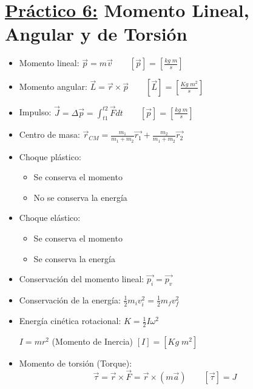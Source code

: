 \documentclass[12pt,a4paper]{article}
\newcommand{\PN}{\par\noindent}
\begin{document}
	\section*{\underline{Práctico 6:} Momento Lineal, Angular y de Torsión}
		\begin{multicols}{2}
			\begin{itemize}
				\item Momento lineal: $\vec{p} = m \vec{v} \qquad [\vec{p}] = [\frac{kg \; m}{s}]$
				\item Momento angular: $\vec{L} = \vec{r} \times \vec{p} \qquad [\vec{L}] = [\frac{Kg \; m^{2}}{s}]$
				\item Impulso: $\vec{J} = \Delta \vec{p} = \int_{t1}^{t2} \vec{F} dt \qquad [\vec{p}] = [\frac{kg \; m}{s}]$
				\item Centro de masa: $\vec{r}_{CM} = \frac{m_{1}}{m_{1} + m_{2}} \vec{r_{1}} + \frac{m_{2}}{m_{1} + m_{2}}
					\vec{r_{2}}$
				\item Choque plástico:
					\begin{itemize}
						\item Se conserva el momento
						\item No se conserva la energía
					\end{itemize}
				\item Choque elástico:
					\begin{itemize}
						\item Se conserva el momento
						\item Se conserva la energía
					\end{itemize}
				\item Conservación del momento lineal: $\vec{p_{i}} = \vec{p_{v}}$
				\item Conservación de la energía: $\frac{1}{2} m_{i} v_{i}^{2} = \frac{1}{2} m_{f} v_{f}^{2}$
				\item Energía cinética rotacional: $K = \frac{1}{2} I \omega^{2}$
					\PN $I = m r^{2}$ (Momento de Inercia) $[I] = [Kg \; m^{2}]$
				\item Momento de torsión (Torque):
					\[
						\vec{\tau} = \vec{r} \times \vec{F} = \vec{r} \times (m\vec{a}) \qquad [\vec{\tau}] = J
					\]
			\end{itemize}
		\end{multicols}
\end{document}
